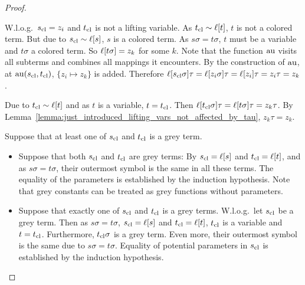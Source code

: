 \documentclass[,%
	paper=a4,%
	DIV12, %
	twoside=false,%
	liststotoc,
	bibtotoc,
	draft=false,%
	numbers=noendperiod
]{scrartcl}
\begin{document}
\begin{proof}
\begin{description}
\begin{compactitem}
			\item W.l.o.g.~$s_\mathrm{cl} = z_i$ and $t_\mathrm{cl}$ is not a lifting variable.
				As $t_\mathrm{cl} \sim \ell[t]$, $t$ is not a colored term.
				But due to $s_\mathrm{cl} \sim \ell[s]$, $s$ is a colored term.
				As $s\sigma = t\sigma$, $t$ must be a variable and $t\sigma$ a colored term.
				So $\ell[t\sigma] = z_k$ for some $k$.
				Note that the function $\operatorname{au}$ visits all subterms and combines all mappings it encounters.
				By the construction of $\operatorname{au}$, at $\operatorname{au}(s_\mathrm{cl}, t_\mathrm{cl})$, $\{ z_i \mapsto z_k \}$ is added.
				Therefore $\ell[s_\mathrm{cl}\sigma]\tau = \ell[z_i\sigma]\tau = \ell[z_i]\tau = z_i\tau = z_k$.

				Due to $t_\mathrm{cl} \sim \ell[t]$ and as $t$ is a variable, $t=t_\mathrm{cl}$.
				Then $\ell[t_\mathrm{cl}\sigma]\tau = \ell[t\sigma]\tau = z_k\tau$. By Lemma~\ref{lemma:just_introduced_lifting_vars_not_affected_by_tau}, $z_k\tau = z_k$.

			\end{compactitem}

		\item[Grey terms.]
			Suppose that at least one of $s_\mathrm{cl}$ and $t_\mathrm{cl}$ is a grey term.
			\begin{itemize}
				\item
					Suppose that both $s_\mathrm{cl}$ and $t_\mathrm{cl}$ are grey terms:
					By $s_\mathrm{cl} = \ell[s]$ and 
					$t_\mathrm{cl} = \ell[t]$, and as $s\sigma = t\sigma$, their outermost symbol is the same in all these terms.
					The equality of the parameters is established by the induction hypothesis.
					Note that grey constants can be treated as grey functions without parameters.

				\item
					Suppose that exactly one of $s_\mathrm{cl}$ and $t_\mathrm{cl}$ is a grey terms. W.l.o.g.~let $s_\mathrm{cl}$ be a grey term. Then as $s\sigma=t\sigma$, $s_\mathrm{cl} = \ell[s]$ and $t_\mathrm{cl} = \ell[t]$, $t_\mathrm{cl}$ is a variable and $t=t_\mathrm{cl}$.
					Furthermore, $t_\mathrm{cl}\sigma$ is a grey term. 
					Even more, their outermost symbol is the same due to $s\sigma = t\sigma$.
					Equality of potential parameters in $s_\mathrm{cl}$ is established by the induction hypothesis.
			\end{itemize}



\end{description}
\end{proof}
\end{document}
